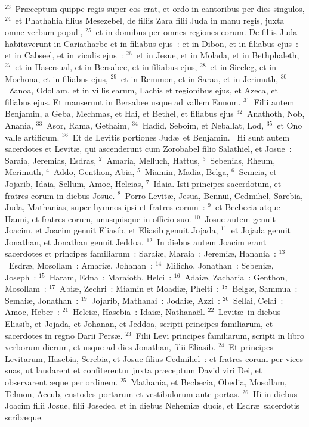${}^{23}$~Pr\ae ceptum quippe regis super eos erat, et ordo in cantoribus per dies singulos,
${}^{24}$~et Phathahia filius Mesezebel, de filiis Zara filii Juda in manu regis, juxta omne verbum populi,
${}^{25}$~et in domibus per omnes regiones eorum. De filiis Juda habitaverunt in Cariatharbe et in filiabus ejus~: et in Dibon, et in filiabus ejus~: et in Cabseel, et in viculis ejus~:
${}^{26}$~et in Jesue, et in Molada, et in Bethphaleth,
${}^{27}$~et in Hasersual, et in Bersabee, et in filiabus ejus,
${}^{28}$~et in Siceleg, et in Mochona, et in filiabus ejus,
${}^{29}$~et in Remmon, et in Saraa, et in Jerimuth,
${}^{30}$~Zanoa, Odollam, et in villis earum, Lachis et regionibus ejus, et Azeca, et filiabus ejus. Et manserunt in Bersabee usque ad vallem Ennom.
${}^{31}$~Filii autem Benjamin, a Geba, Mechmas, et Hai, et Bethel, et filiabus ejus 
${}^{32}$~Anathoth, Nob, Anania,
${}^{33}$~Asor, Rama, Gethaim,
${}^{34}$~Hadid, Seboim, et Neballat, Lod,
${}^{35}$~et Ono valle artificum.
${}^{36}$~Et de Levitis portiones Jud\ae\ et Benjamin.
~\lettrine[lines=10,image=true,loversize=0.05,lraise=-0.03]{H}{}i sunt autem sacerdotes et Levit\ae , qui ascenderunt cum Zorobabel filio Salathiel, et Josue~: Saraia, Jeremias, Esdras,
${}^{2}$~Amaria, Melluch, Hattus,
${}^{3}$~Sebenias, Rheum, Merimuth,
${}^{4}$~Addo, Genthon, Abia,
${}^{5}$~Miamin, Madia, Belga,
${}^{6}$~Semeia, et Jojarib, Idaia, Sellum, Amoc, Helcias,
${}^{7}$~Idaia. Isti principes sacerdotum, et fratres eorum in diebus Josue.
${}^{8}$~Porro Levit\ae , Jesua, Bennui, Cedmihel, Sarebia, Juda, Mathanias, super hymnos ipsi et fratres eorum~:
${}^{9}$~et Becbecia atque Hanni, et fratres eorum, unusquisque in officio suo.
${}^{10}$~Josue autem genuit Joacim, et Joacim genuit Eliasib, et Eliasib genuit Jojada,
${}^{11}$~et Jojada genuit Jonathan, et Jonathan genuit Jeddoa.
${}^{12}$~In diebus autem Joacim erant sacerdotes et principes familiarum~: Sarai\ae , Maraia~: Jeremi\ae , Hanania~:
${}^{13}$~Esdr\ae , Mosollam~: Amari\ae , Johanan~:
${}^{14}$~Milicho, Jonathan~: Sebeni\ae , Joseph~:
${}^{15}$~Haram, Edna~: Maraioth, Helci~:
${}^{16}$~Adai\ae , Zacharia~: Genthon, Mosollam~:
${}^{17}$~Abi\ae , Zechri~: Miamin et Moadi\ae , Phelti~:
${}^{18}$~Belg\ae , Sammua~: Semai\ae , Jonathan~:
${}^{19}$~Jojarib, Mathanai~: Jodai\ae , Azzi~:
${}^{20}$~Sellai, Celai~: Amoc, Heber~:
${}^{21}$~Helci\ae , Hasebia~: Idai\ae , Nathana\"el.
${}^{22}$~Levit\ae\ in diebus Eliasib, et Jojada, et Johanan, et Jeddoa, scripti principes familiarum, et sacerdotes in regno Darii Pers\ae .
${}^{23}$~Filii Levi principes familiarum, scripti in libro verborum dierum, et usque ad dies Jonathan, filii Eliasib.
${}^{24}$~Et principes Levitarum, Hasebia, Serebia, et Josue filius Cedmihel~: et fratres eorum per vices suas, ut laudarent et confiterentur juxta pr\ae ceptum David viri Dei, et observarent \ae que per ordinem.
${}^{25}$~Mathania, et Becbecia, Obedia, Mosollam, Telmon, Accub, custodes portarum et vestibulorum ante portas.
${}^{26}$~Hi in diebus Joacim filii Josue, filii Josedec, et in diebus Nehemi\ae\ ducis, et Esdr\ae\ sacerdotis scrib\ae que.



